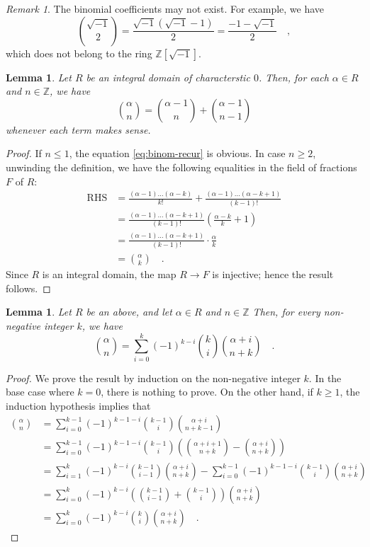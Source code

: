 \documentclass[pdftex,a4paper,12pt]{scrartcl}
\theoremstyle{plain}
\newtheorem{lemma}[theorem]{Lemma}
\theoremstyle{definition}
\theoremstyle{remark}
\newtheorem{remark}[theorem]{Remark}
\numberwithin{equation}{section}
\begin{document}
\begin{remark}
The binomial coefficients may not exist.
For example, we have
\[
\binom{\sqrt{-1}}{2}
= \frac{\sqrt{-1}(\sqrt{-1}-1)}2
= \frac{-1-\sqrt{-1}}2
\quad,
\]
which does not belong to the ring $\mathbb Z[\sqrt{-1}]$.
\end{remark}

\begin{lemma}
\label{lem:binom-recurrence}
Let $R$ be an integral domain of characterstic $0$.
Then, for each $\alpha\in R$ and $n\in\mathbb Z$, we have
\begin{equation}
\label{eq:binom-recur}
\binom{\alpha}{n} = \binom{\alpha-1}{n} + \binom{\alpha-1}{n-1}
\end{equation}
whenever each term makes sense.
\end{lemma}
\begin{proof}
If $n\le 1$, the equation \eqref{eq:binom-recur} is obvious.
In case $n\ge 2$, unwinding the definition, we have the following equalities in the field of fractions $F$ of $R$:
\[
\begin{split}
\text{RHS}
&= \frac{(\alpha-1)\dots(\alpha-k)}{k!} + \frac{(\alpha-1)\dots(\alpha-k+1)}{(k-1)!} \\
&= \frac{(\alpha-1)\dots(\alpha-k+1)}{(k-1)!}\left(\frac{\alpha-k}{k}+1\right) \\
&= \frac{(\alpha-1)\dots(\alpha-k+1)}{(k-1)!}\cdot\frac{\alpha}{k} \\
&= \binom{\alpha}{k}
\quad.
\end{split}
\]
Since $R$ is an integral domain, the map $R\to F$ is injective; hence the result follows.
\end{proof}

\begin{lemma}
\label{lem:binom-altsum}
Let $R$ be an above, and let $\alpha\in R$ and $n\in\mathbb Z$
Then, for every non-negative integer $k$, we have
\begin{equation}
\label{eq:binom-altsum}
\binom{\alpha}{n}
= \sum_{i=0}^k (-1)^{k-i}\binom{k}{i}\binom{\alpha+i}{n+k}
\quad.
\end{equation}
\end{lemma}
\begin{proof}
We prove the result by induction on the non-negative integer $k$.
In the base case where $k=0$, there is nothing to prove.
On the other hand, if $k\ge 1$, the induction hypothesis implies that
\[
\begin{split}
\binom{\alpha}{n}
&= \sum_{i=0}^{k-1}(-1)^{k-1-i}\binom{k-1}{i}\binom{\alpha+i}{n+k-1} \\
&= \sum_{i=0}^{k-1}(-1)^{k-1-i}\binom{k-1}{i}\left(\binom{\alpha+i+1}{n+k}-\binom{\alpha+i}{n+k}\right) \\
&= \sum_{i=1}^k(-1)^{k-i}\binom{k-1}{i-1}\binom{\alpha+i}{n+k} - \sum_{i=0}^{k-1}(-1)^{k-1-i}\binom{k-1}{i}\binom{\alpha+i}{n+k} \\
&= \sum_{i=0}^k (-1)^{k-i}\left(\binom{k-1}{i-1}+\binom{k-1}{i}\right)\binom{\alpha+i}{n+k} \\
&= \sum_{i=0}^k (-1)^{k-i}\binom{k}{i}\binom{\alpha+i}{n+k}
\quad.
\end{split}
\]
\end{proof}
\end{document}
